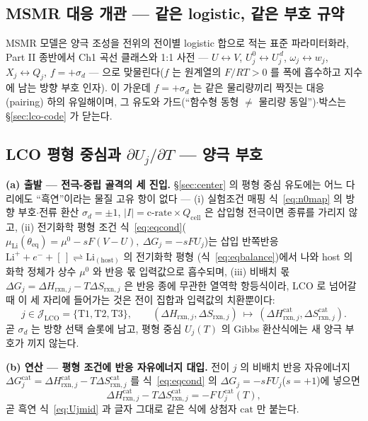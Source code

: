\documentclass[11pt,a4paper]{article}
\newcommand{\eq}{\mathrm{eq}}
\newcommand{\cell}{\mathrm{cell}}
\newcommand{\rxn}{\mathrm{rxn}}
\begin{document}
\subsection{MSMR 대응 개관 --- 같은 logistic, 같은 부호 규약}\label{sec:lco-preview}
MSMR 모델은 양극 조성을 전위의 전이별 logistic 합으로 적는 표준
파라미터화라, Part II 종반에서 Ch1 곡선 클래스와 1:1 사전 --- $U\leftrightarrow V$,
$U_j^0\leftrightarrow U_j^{\,d}$, $\omega_j\leftrightarrow w_j$, $X_j\leftrightarrow Q_j$, $f=+\sigma_d$ ---
으로 맞물린다($f$ 는 원계열의 $F/RT>0$ 를 폭에 흡수하고 지수에 남는 방향 부호 인자). 이 가운데
$f=+\sigma_d$ 는 같은 물리량끼리 짝짓는 대응(pairing) 하의 유일해이며, 그 유도와 가드(``함수형 동형 $\ne$ 물리량
동일'')$\cdot$박스는 \S\ref{sec:lco-code} 가 닫는다.

\subsection{LCO 평형 중심과 $\partial U_j/\partial T$ — 양극 부호}\label{sec:lco-center}
\textbf{(a) 출발 — 전극-중립 골격의 세 진입.}
\S\ref{sec:center} 의 평형 중심 유도에는 어느 다리에도 ``흑연''이라는 물질 고유 항이 없다 —
(i) 실험조건 매핑 식~\eqref{eq:n0map} 의 방향 부호$\cdot$전류 환산
$\sigma_d=\pm1$, $|I|=\text{c-rate}\times Q_\cell$ 은 삽입형 전극이면 종류를 가리지 않고, (ii) 전기화학 평형
조건 식~\eqref{eq:eqcond}($\mu_\mathrm{Li}(\theta_\eq)=\mu^0-sF(V-U),\ \Delta G_j=-sFU_j$)는 삽입
반쪽반응 $\mathrm{Li}^++e^-+[\,]\rightleftharpoons\mathrm{Li}_{(\text{host})}$ 의 전기화학 평형
(식~\eqref{eq:eqbalance})에서 나와 host 의 화학 정체가 상수 $\mu^0$ 와 반응 몫 입력값으로 흡수되며,
(iii) 비배치 몫 $\Delta G_j=\Delta H_{\rxn,j}-T\Delta S_{\rxn,j}$ 은 반응 종에 무관한 열역학 항등식이라,
LCO 로 넘어갈 때 이 세 자리에 들어가는 것은 전이 집합과 입력값의 치환뿐이다:
\begin{equation}
j\in\mathcal J_\mathrm{LCO}=\{\mathrm{T1},\mathrm{T2},\mathrm{T3}\},\qquad
(\Delta H_{\rxn,j},\Delta S_{\rxn,j})\ \longmapsto\
(\Delta H_{\rxn,j}^\mathrm{cat},\Delta S_{\rxn,j}^\mathrm{cat}).
\label{eq:lco-n0sub}
\end{equation}
곧 $\sigma_d$ 는 방향 선택 슬롯에 남고, 평형 중심 $U_j(T)$ 의 Gibbs 환산식에는 새 양극 부호가 끼지 않는다.

\textbf{(b) 연산 — 평형 조건에 반응 자유에너지 대입.}
전이 $j$ 의 비배치 반응 자유에너지 $\Delta G_j^\mathrm{cat}=\Delta H_{\rxn,j}^\mathrm{cat}
-T\Delta S_{\rxn,j}^\mathrm{cat}$ 를 식~\eqref{eq:eqcond} 의 $\Delta G_j=-sFU_j$($s=+1$)에 넣으면
\[
\Delta H_{\rxn,j}^\mathrm{cat}-T\Delta S_{\rxn,j}^\mathrm{cat}=-F\,U_j^\mathrm{cat}(T),
\]
곧 흑연 식~\eqref{eq:Ujmid} 과 글자 그대로 같은 식에 상첨자 $\mathrm{cat}$ 만 붙는다.
\end{document}
